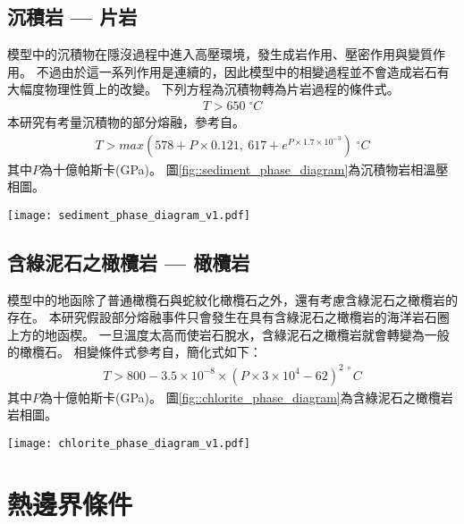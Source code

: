 \subsection{沉積岩 --- 片岩}
模型中的沉積物在隱沒過程中進入高壓環境，發生成岩作用、壓密作用與變質作用。
不過由於這一系列作用是連續的，因此模型中的相變過程並不會造成岩石有大幅度物理性質上的改變。
下列方程為沉積物轉為片岩過程的條件式。
\begin{align}
T > 650\; ^{\circ} C
\end{align}
本研究有考量沉積物的部分熔融，參考自\citealp{van2011subduction}。
\begin{align}
    T > max (578+ P \times 0.121,\ 617+e^{P\times 1.7\times 10^{-3}}) \; ^{\circ} C
\end{align}
其中$P$為十億帕斯卡(GPa)。
圖\ref{fig::sediment_phase_diagram}為沉積物岩相溫壓相圖。
\begin{figure*}[ht!]
    \centering
    \texttt{[image: sediment\_phase\_diagram\_v1.pdf]}
    \caption[沉積物變質岩相圖，參考自\citealp{van2011subduction}]{沉積物變質岩相圖，橘線為沉積物含水固相線，參考自\citealp{van2011subduction}。}
    \label{fig::sediment_phase_diagram}
\end{figure*}

\subsection{含綠泥石之橄欖岩 --- 橄欖岩}

模型中的地函除了普通橄欖石與蛇紋化橄欖石之外，還有考慮含綠泥石之橄欖岩的存在。
本研究假設部分熔融事件只會發生在具有含綠泥石之橄欖岩的海洋岩石圈上方的地函楔。
一旦溫度太高而使岩石脫水，含綠泥石之橄欖岩就會轉變為一般的橄欖石。
相變條件式參考自\citealp{Grove2009}，簡化式如下：
\begin{align}
T > 800-3.5\times 10^{-8}\times (P\times 3 \times 10^{4} -62)^{2 \;\circ}C
\end{align}
其中$P$為十億帕斯卡(GPa)。
圖\ref{fig::chlorite_phase_diagram}為含綠泥石之橄欖岩岩相圖。
\begin{figure*}[ht!]
    \centering
    \texttt{[image: chlorite\_phase\_diagram\_v1.pdf]}
    \caption[含綠泥石之橄欖岩岩相圖，參考自\citealp{Grove2009}]{含綠泥石之橄欖岩岩相圖，橘紅線為含綠泥石之橄欖岩脫水相變線，參考自\citealp{Grove2009}。}
    \label{fig::chlorite_phase_diagram}
\end{figure*}

\section{熱邊界條件}\label{熱邊界條件}

